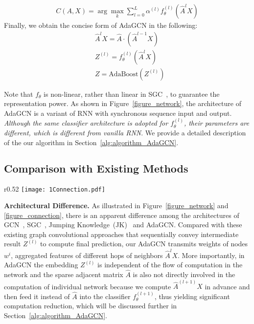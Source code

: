 \documentclass{article} \usepackage{iclr2021_conference,times}
\begin{document}
\begin{equation} 
\begin{aligned}
C(A, X)=\arg \max _{k} \sum_{l=0}^{L} \alpha^{(l)} f_\theta^{(l)}(\hat{A}^{l}X)
\end{aligned} 
\end{equation}
Finally, we obtain the concise form of AdaGCN in the following:
\begin{equation} 
\label{eq_AdaGCN}
\begin{aligned} 
&\hat{A}^{l}X=\hat{A} \cdot (\hat{A}^{l-1}X)\\
&Z^{(l)}=f_{\theta}^{(l)}(\hat{A}^l X)\\
&      Z=\text{AdaBoost}(Z^{(l)})
\end{aligned} 
\end{equation}

Note that $f_\theta$ is non-linear, rather than linear in SGC~\citep{wu2019simplifying}, to guarantee the representation power. As shown in Figure~\ref{figure_network}, the architecture of AdaGCN is a variant of RNN with synchronous sequence input and output. \textit{Although the same classifier architecture is adopted for $f_{\theta}^{(l)}$, their parameters are different, which is different from vanilla RNN}. We provide a detailed description of the our algorithm in Section~\ref{alg:algorithm_AdaGCN}.		

\subsection{Comparison with Existing Methods}
\begin{wrapfigure}[16]{r}{0.52\textwidth}
	\texttt{[image: 1Connection.pdf]}
	\caption{Comparison of the graph model architectures. $f_a$ in JK network  denotes one aggregation layer with aggregation function such as concatenation or max pooling.}
	\label{figure_connection}
\end{wrapfigure}

\textbf{Architectural Difference.} As illustrated in Figure~\ref{figure_network} and \ref{figure_connection}, there is an apparent difference among the architectures of GCN~\citep{kipf2016semi}, SGC~\citep{wu2019simplifying}, Jumping Knowledge~(JK)~\citep{xu2018representation} and AdaGCN. Compared with these existing graph convolutional approaches that sequentially convey intermediate result $Z^{(l)}$ to compute final prediction, our AdaGCN transmits weights of nodes $w^i$, aggregated features of different hops of neighbors $\hat{A}^{l}X$. More importantly, in AdaGCN the embedding $Z^{(l)}$ is independent of the flow of computation in the network  and the sparse adjacent matrix $\hat{A}$ is also not directly involved in the computation of individual network because we compute $\hat{A}^{(l+1)}X$ in advance and then feed it instead of $\hat{A}$ into the classifier $f_{\theta}^{(l+1)}$, thus yielding significant computation reduction, which will be discussed further in  Section~\ref{alg:algorithm_AdaGCN}.
\end{document}
